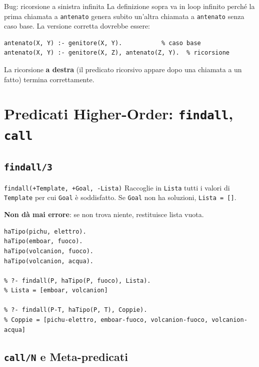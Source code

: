 \documentclass[12pt,a4paper]{article}
\begin{document}
\begin{warnbox}{Bug: ricorsione a sinistra infinita}
La definizione sopra va in loop infinito perché la prima chiamata a
\texttt{antenato} genera subito un'altra chiamata a \texttt{antenato}
senza caso base. La versione corretta dovrebbe essere:
\begin{lstlisting}
antenato(X, Y) :- genitore(X, Y).           % caso base
antenato(X, Y) :- genitore(X, Z), antenato(Z, Y).  % ricorsione
\end{lstlisting}
La ricorsione \textbf{a destra} (il predicato ricorsivo appare dopo una
chiamata a un fatto) termina correttamente.
\end{warnbox}

\section{Predicati Higher-Order: \texttt{findall}, \texttt{call}}

\subsection{\texttt{findall/3}}

\begin{defbox}{\texttt{findall(+Template, +Goal, -Lista)}}
Raccoglie in \texttt{Lista} tutti i valori di \texttt{Template} per cui
\texttt{Goal} è soddisfatto. Se \texttt{Goal} non ha soluzioni, \texttt{Lista = []}.

\textbf{Non dà mai errore}: se non trova niente, restituisce lista vuota.
\end{defbox}

\begin{lstlisting}
haTipo(pichu, elettro).
haTipo(emboar, fuoco).
haTipo(volcanion, fuoco).
haTipo(volcanion, acqua).

% ?- findall(P, haTipo(P, fuoco), Lista).
% Lista = [emboar, volcanion]

% ?- findall(P-T, haTipo(P, T), Coppie).
% Coppie = [pichu-elettro, emboar-fuoco, volcanion-fuoco, volcanion-acqua]
\end{lstlisting}

\subsection{\texttt{call/N} e Meta-predicati}
\end{document}
